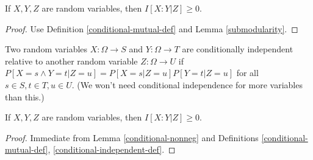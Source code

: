 \begin{lemma}\label{conditional-nonneg}  
If $X,Y,Z$ are random variables, then $I[X:Y|Z] \ge 0$.
\end{lemma}

\begin{proof}  Use Definition \ref{conditional-mutual-def} and Lemma \ref{submodularity}.
\end{proof}

\begin{definition}\label{conditional-independent-def}
  Two random variables $X: \Omega \to S$ and $Y: \Omega \to T$ are conditionally independent relative to another random variable $Z: \Omega \to U$ if $P[ X = s \wedge Y = t| Z=u] = P[X=s|Z=u] P[Y=t|Z=u]$ for all $s \in S, t \in T, u \in U$.  (We won't need conditional independence for more variables than this.)
\end{definition}

\begin{lemma}\label{conditional-vanish}  
  If $X,Y,Z$ are random variables, then $I[X:Y|Z] \ge 0$.
\end{lemma}

\begin{proof}  Immediate from Lemma \ref{conditional-nonneg} and Definitions \ref{conditional-mutual-def}, \ref{conditional-independent-def}.
\end{proof}
